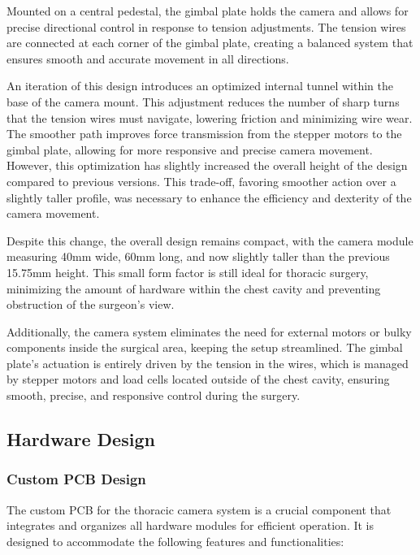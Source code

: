 Mounted on a central pedestal, the gimbal plate holds the camera and allows for precise directional control in response to tension adjustments. The tension wires are connected at each corner of the gimbal plate, creating a balanced system that ensures smooth and accurate movement in all directions. 

An iteration of this design introduces an optimized internal tunnel within the base of the camera mount. This adjustment reduces the number of sharp turns that the tension wires must navigate, lowering friction and minimizing wire wear. The smoother path improves force transmission from the stepper motors to the gimbal plate, allowing for more responsive and precise camera movement. However, this optimization has slightly increased the overall height of the design compared to previous versions. This trade-off, favoring smoother action over a slightly taller profile, was necessary to enhance the efficiency and dexterity of the camera movement. 

Despite this change, the overall design remains compact, with the camera module measuring 40mm wide, 60mm long, and now slightly taller than the previous 15.75mm height. This small form factor is still ideal for thoracic surgery, minimizing the amount of hardware within the chest cavity and preventing obstruction of the surgeon’s view. 

Additionally, the camera system eliminates the need for external motors or bulky components inside the surgical area, keeping the setup streamlined. The gimbal plate’s actuation is entirely driven by the tension in the wires, which is managed by stepper motors and load cells located outside of the chest cavity, ensuring smooth, precise, and responsive control during the surgery. 



\subsection{Hardware Design}

\subsubsection{Custom PCB Design}

The custom PCB for the thoracic camera system is a crucial component that integrates and organizes all hardware modules for efficient operation. It is designed to accommodate the following features and functionalities:

